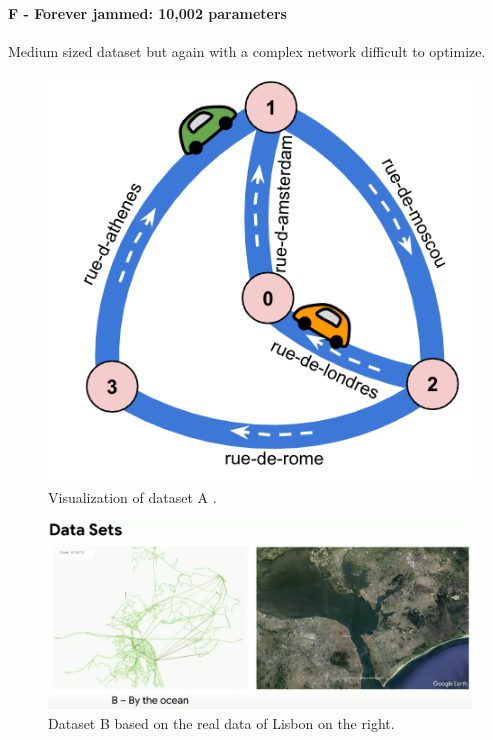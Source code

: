 \paragraph{F - Forever jammed: 10,002 parameters} Medium sized dataset but again with a complex network difficult to optimize.

\begin{figure}
    \centering
    \includegraphics[width=.5\linewidth]{img/hashcode/figure5.png}
    \caption[Visualization of dataset A]{
        Visualization of dataset A \cite{google2023google}.
    }
    \label{fig:hashcode_dataset_a}
\end{figure}

\begin{figure}
    \centering
    \includegraphics[width=\linewidth]{img/screenshots/hashcode_datasets_b.png}
    \caption[Visualization of dataset B]{
        Dataset B based on the real data of Lisbon on the right\footnotemark.
    }
    \label{fig:hashcode_dataset_b}
\end{figure}


